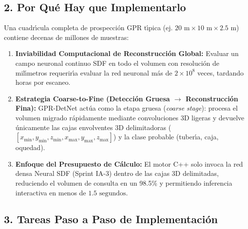 \documentclass[11pt,a4paper]{article}
\begin{document}
\subsection{2. Por Qu{\'e} Hay que Implementarlo}
Una cuadr{\'\i}cula completa de prospecci{\'o}n GPR t{\'\i}pica (ej. $20\text{ m} \times 10\text{ m} \times 2.5\text{ m}$) contiene decenas de millones de muestras:
\begin{enumerate}
    \item \textbf{Inviabilidad Computacional de Reconstrucci{\'o}n Global:} Evaluar un campo neuronal continuo SDF en todo el volumen con resoluci{\'o}n de mil{\'\i}metros requerir{\'\i}a evaluar la red neuronal m{\'a}s de $2 \times 10^8$ veces, tardando horas por escaneo.
    \item \textbf{Estrategia Coarse-to-Fine (Detecci{\'o}n Gruesa $\to$ Reconstrucci{\'o}n Fina):} GPR-DetNet act{\'u}a como la etapa gruesa (\textit{coarse stage}): procesa el volumen migrado r{\'a}pidamente mediante convoluciones 3D ligeras y devuelve {\'u}nicamente las cajas envolventes 3D delimitadoras ($[x_{\min}, y_{\min}, z_{\min}, x_{\max}, y_{\max}, z_{\max}]$) y la clase probable (tuber{\'\i}a, caja, oquedad).
    \item \textbf{Enfoque del Presupuesto de C{\'a}lculo:} El motor C++ solo invoca la red densa Neural SDF (Sprint IA-3) dentro de las cajas 3D delimitadas, reduciendo el volumen de consulta en un 98.5\% y permitiendo inferencia interactiva en menos de $1.5\text{ segundos}$.
\end{enumerate}

\subsection{3. Tareas Paso a Paso de Implementaci{\'o}n}
\end{document}

